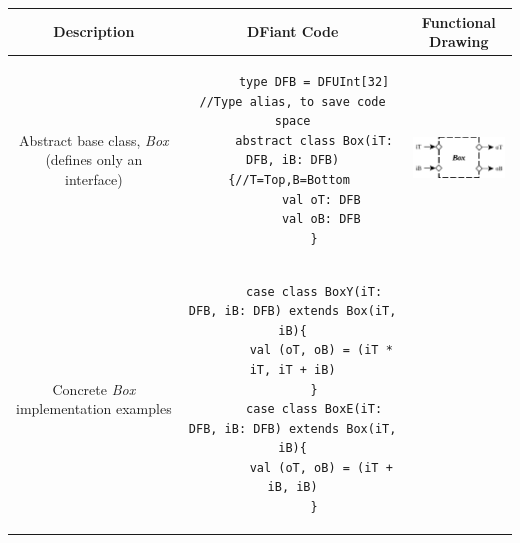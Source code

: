 \begin{table}[t]
	\centering
  \vspace*{0.2cm}
	\setlength\tabcolsep{2pt}
	\scriptsize
  \label{tbl:Box}
  \begin{tabular}{|c|c|c|}
    \hline 
    \textbf{Description} & \textbf{DFiant Code} & \textbf{Functional Drawing} \\ 
    \hline
    \begin{minipage}{0.1\textwidth}
      \footnotesize
      \flushleft
      \tiny
      Abstract base class, \textit{Box} (defines only an interface)
    \end{minipage} 
    &
    \begin{minipage}{0.48\textwidth}
      \begin{verbatim}
      type DFB = DFUInt[32] //Type alias, to save code space
      abstract class Box(iT: DFB, iB: DFB) {//T=Top,B=Bottom 
        val oT: DFB
        val oB: DFB
      }
      \end{verbatim}
    \end{minipage} 
    &  
    \begin{minipage}[c][1.5cm]{0.34\textwidth}
      \centering
      \includegraphics[height=1.3cm]{graphics/Box.pdf}%
    \end{minipage} 
    \\ 
    \hline 
    \begin{minipage}{0.1\textwidth}
      \footnotesize
      \flushleft
      \tiny
      Concrete \textit{Box} implementation examples
    \end{minipage} 
    &
    \begin{minipage}{0.48\textwidth}
      \begin{verbatim}
      case class BoxY(iT: DFB, iB: DFB) extends Box(iT, iB){
        val (oT, oB) = (iT * iT, iT + iB)
      }
      case class BoxE(iT: DFB, iB: DFB) extends Box(iT, iB){
        val (oT, oB) = (iT + iB, iB)
      }
      \end{verbatim}
    \end{minipage} 
    &  
    \begin{minipage}[c][1.8cm]{0.34\textwidth}

\end{minipage}
\end{tabular}
\end{table}
